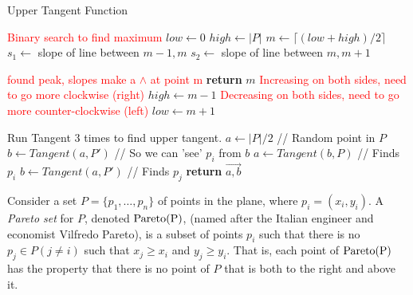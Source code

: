 \documentclass[11pt]{article}
\newcommand{\pareto}[1]{\rm{Pareto}(#1)}
\begin{document}
\begin{algorithm}
    \caption{Upper Tangent Function}
    \label{alg:prob1}
    \begin{algorithmic}[1]
        \State \textcolor{red}{Binary search to find maximum}
        \State $low \gets 0$
        \State $high \gets |P|$
            \State $m \gets \lceil (low + high)/2 \rceil$
            \State $s_1 \gets $ slope of line between $m-1, m$
            \State $s_2 \gets $ slope of line between $m, m+1$
            
                \State \textcolor{red}{found peak, slopes make a $\wedge$ at point m}
                \State \textbf{return} $m$
                \State \textcolor{red}{Increasing on both sides, need to go more clockwise (right)}
                \State $high \gets m - 1$
                \State \textcolor{red}{Decreasing on both sides, need to go more counter-clockwise (left)}
                \State $low \gets m + 1$
            \EndIf
            
        \EndWhile
    \EndFunction
    \end{algorithmic}

    \begin{algorithmic}[1]
            \State Run Tangent 3 times to find upper tangent.
            \State $a \gets |P|/2$ \quad // Random point in $P$
            \State $b \gets Tangent(a, P')$ \quad // So we can 'see' $p_i$ from $b$
            \State $a \gets Tangent(b, P)$ \quad // Finds $p_i$
            \State $b \gets Tangent(a, P')$ \quad // Finds $p_j$
            \State \textbf{return} $\overrightarrow{a,b}$
        \EndFunction
        \end{algorithmic}

\end{algorithm}













Consider a set $P = \{p_1, \ldots, p_n \}$ of points in the plane, where $p_i =
(x_i, y_i)$. A \emph{Pareto set} for $P$, denoted $\pareto{P}$, (named after
the Italian engineer and economist Vilfredo Pareto), is a subset of points
$p_i$ such that there is no $p_j \in P (j \neq i)$ such that $x_j \geq x_i$ and
$y_j \geq y_i$.  That is, each point of $\pareto{P}$ has the property that
there is no point of $P$ that is both to the right and above it.
\end{document}
